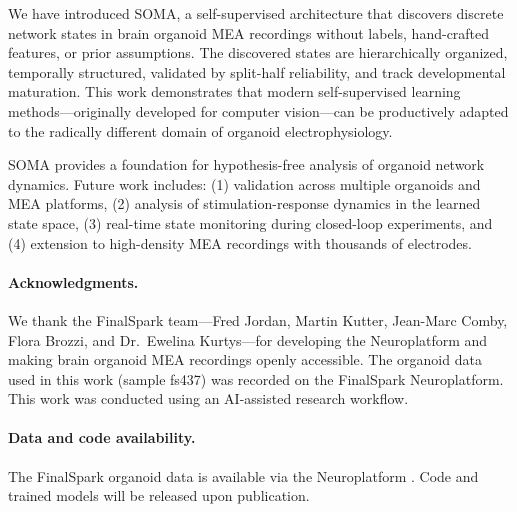 \documentclass{article}
\begin{document}
We have introduced SOMA, a self-supervised architecture that discovers discrete network states in brain organoid MEA recordings without labels, hand-crafted features, or prior assumptions. The discovered states are hierarchically organized, temporally structured, validated by split-half reliability, and track developmental maturation. This work demonstrates that modern self-supervised learning methods---originally developed for computer vision---can be productively adapted to the radically different domain of organoid electrophysiology.

SOMA provides a foundation for hypothesis-free analysis of organoid network dynamics. Future work includes: (1) validation across multiple organoids and MEA platforms, (2) analysis of stimulation-response dynamics in the learned state space, (3) real-time state monitoring during closed-loop experiments, and (4) extension to high-density MEA recordings with thousands of electrodes.

\paragraph{Acknowledgments.}
We thank the FinalSpark team---Fred Jordan, Martin Kutter, Jean-Marc Comby, Flora Brozzi, and Dr.\ Ewelina Kurtys---for developing the Neuroplatform and making brain organoid MEA recordings openly accessible. The organoid data used in this work (sample fs437) was recorded on the FinalSpark Neuroplatform. This work was conducted using an AI-assisted research workflow.

\paragraph{Data and code availability.}
The FinalSpark organoid data is available via the Neuroplatform \citep{jordan2024open}. Code and trained models will be released upon publication.


\end{document}
